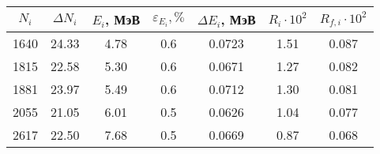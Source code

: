 \begin{tabular}{ccccccc}
\toprule
$N_i$ & $\Delta N_i$ & $E_i$, МэВ & $\varepsilon_{E_i}, \%$ & $\Delta E_i$, МэВ & $R_i \cdot 10^2$ & $R_{f,i} \cdot 10^2$ \\
\midrule
1640 & 24.33 & 4.78 & 0.6 & 0.0723 & 1.51 & 0.087 \\
1815 & 22.58 & 5.30 & 0.6 & 0.0671 & 1.27 & 0.082 \\
1881 & 23.97 & 5.49 & 0.6 & 0.0712 & 1.30 & 0.081 \\
2055 & 21.05 & 6.01 & 0.5 & 0.0626 & 1.04 & 0.077 \\
2617 & 22.50 & 7.68 & 0.5 & 0.0669 & 0.87 & 0.068 \\
\bottomrule
\end{tabular}
